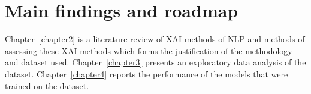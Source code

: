 \section{Main findings and roadmap}
Chapter~\ref{chapter2} is a literature review of XAI methods of NLP and methods of assessing these XAI methods which forms the justification of the methodology and dataset used. Chapter~\ref{chapter3} presents an exploratory data analysis of the dataset. Chapter~\ref{chapter4} reports the performance of the models that were trained on the dataset. 